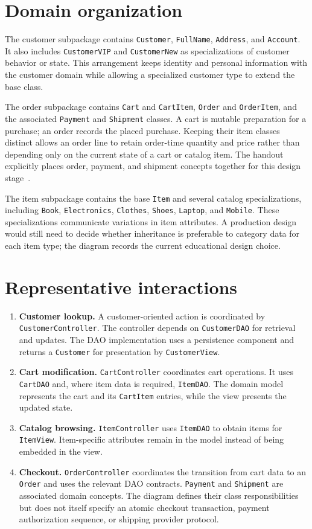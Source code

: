 \documentclass[12pt,a4paper,oneside]{report}
\begin{document}
\section{Domain organization}
The customer subpackage contains \texttt{Customer}, \texttt{FullName}, \texttt{Address}, and \texttt{Account}. It also includes \texttt{CustomerVIP} and \texttt{CustomerNew} as specializations of customer behavior or state. This arrangement keeps identity and personal information with the customer domain while allowing a specialized customer type to extend the base class.

The order subpackage contains \texttt{Cart} and \texttt{CartItem}, \texttt{Order} and \texttt{OrderItem}, and the associated \texttt{Payment} and \texttt{Shipment} classes. A cart is mutable preparation for a purchase; an order records the placed purchase. Keeping their item classes distinct allows an order line to retain order-time quantity and price rather than depending only on the current state of a cart or catalog item. The handout explicitly places order, payment, and shipment concepts together for this design stage~\cite{handout}.

The item subpackage contains the base \texttt{Item} and several catalog specializations, including \texttt{Book}, \texttt{Electronics}, \texttt{Clothes}, \texttt{Shoes}, \texttt{Laptop}, and \texttt{Mobile}. These specializations communicate variations in item attributes. A production design would still need to decide whether inheritance is preferable to category data for each item type; the diagram records the current educational design choice.

\section{Representative interactions}
\begin{enumerate}
\item \textbf{Customer lookup.} A customer-oriented action is coordinated by \texttt{CustomerController}. The controller depends on \texttt{CustomerDAO} for retrieval and updates. The DAO implementation uses a persistence component and returns a \texttt{Customer} for presentation by \texttt{CustomerView}.
\item \textbf{Cart modification.} \texttt{CartController} coordinates cart operations. It uses \texttt{CartDAO} and, where item data is required, \texttt{ItemDAO}. The domain model represents the cart and its \texttt{CartItem} entries, while the view presents the updated state.
\item \textbf{Catalog browsing.} \texttt{ItemController} uses \texttt{ItemDAO} to obtain items for \texttt{ItemView}. Item-specific attributes remain in the model instead of being embedded in the view.
\item \textbf{Checkout.} \texttt{OrderController} coordinates the transition from cart data to an \texttt{Order} and uses the relevant DAO contracts. \texttt{Payment} and \texttt{Shipment} are associated domain concepts. The diagram defines their class responsibilities but does not itself specify an atomic checkout transaction, payment authorization sequence, or shipping provider protocol.
\end{enumerate}
\end{document}
